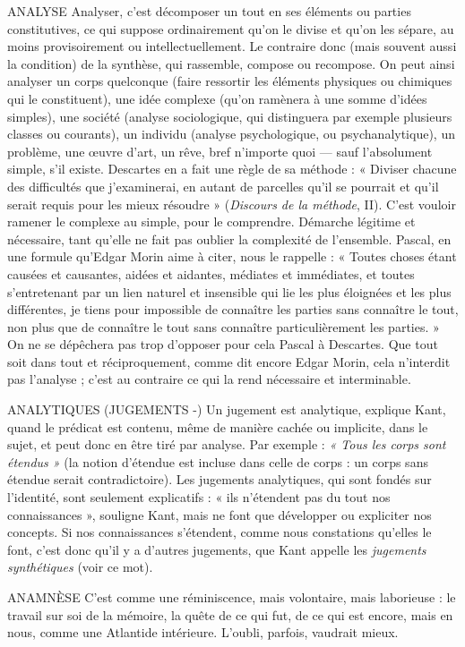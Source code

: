 ANALYSE Analyser, c’est décomposer un tout en ses éléments ou parties
constitutives, ce qui suppose ordinairement qu’on le divise et
qu'on les sépare, au moins provisoirement ou intellectuellement. Le contraire
donc (mais souvent aussi la condition) de la synthèse, qui rassemble, compose
ou recompose. On peut ainsi analyser un corps quelconque (faire ressortir les
éléments physiques ou chimiques qui le constituent), une idée complexe
(qu'on ramènera à une somme d’idées simples), une société (analyse sociologique,
qui distinguera par exemple plusieurs classes ou courants), un individu
(analyse psychologique, ou psychanalytique), un problème, une œuvre d’art,
un rêve, bref n'importe quoi — sauf l’absolument simple, s’il existe. Descartes
en a fait une règle de sa méthode : « Diviser chacune des difficultés que j’examinerai,
en autant de parcelles qu’il se pourrait et qu’il serait requis pour les
mieux résoudre » ({\it Discours de la méthode}, II). C’est vouloir ramener le complexe
au simple, pour le comprendre. Démarche légitime et nécessaire, tant
qu'elle ne fait pas oublier la complexité de l’ensemble. Pascal, en une formule
qu'Edgar Morin aime à citer, nous le rappelle : « Toutes choses étant causées et
causantes, aidées et aidantes, médiates et immédiates, et toutes s’entretenant
par un lien naturel et insensible qui lie les plus éloignées et les plus différentes,
je tiens pour impossible de connaître les parties sans connaître le tout, non plus
que de connaître le tout sans connaître particulièrement les parties. » On ne se
dépêchera pas trop d’opposer pour cela Pascal à Descartes. Que tout soit dans
tout et réciproquement, comme dit encore Edgar Morin, cela n’interdit pas
l'analyse ; c’est au contraire ce qui la rend nécessaire et interminable.

ANALYTIQUES (JUGEMENTS -) Un jugement est analytique, explique Kant,
quand le prédicat est contenu, même de
manière cachée ou implicite, dans le sujet, et peut donc en être tiré par analyse.
Par exemple : {\it « Tous les corps sont étendus »} (la notion d’étendue est incluse dans
celle de corps : un corps sans étendue serait contradictoire). Les jugements analytiques,
qui sont fondés sur l'identité, sont seulement explicatifs : « ils n’étendent
pas du tout nos connaissances », souligne Kant, mais ne font que développer
ou expliciter nos concepts. Si nos connaissances s'étendent, comme
nous constations qu’elles le font, c’est donc qu’il y a d’autres jugements, que
Kant appelle les {\it jugements synthétiques} (voir ce mot).

ANAMNÈSE C’est comme une réminiscence, mais volontaire, mais laborieuse :
le travail sur soi de la mémoire, la quête de ce qui fut,
de ce qui est encore, mais en nous, comme une Atlantide intérieure. L’oubli,
parfois, vaudrait mieux.

